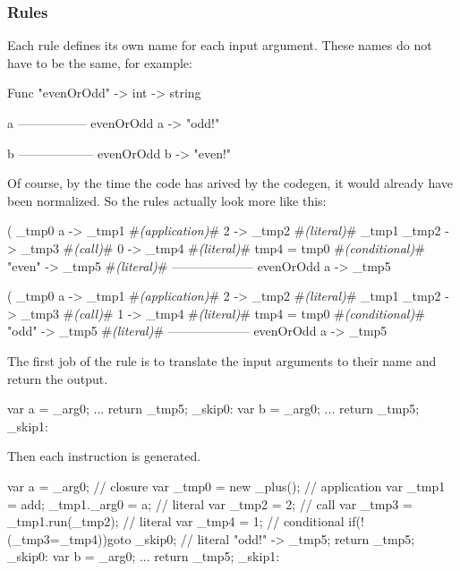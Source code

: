 \subsubsection{Rules}

Each rule defines its own name for each input argument.
These names do not have to be the same, for example:

\begin{code}
    Func "evenOrOdd" -> int -> string
    
    a%
    -----------------
    evenOrOdd a -> "odd!"

    b%
    ------------------
    evenOrOdd b -> "even!"
\end{code}

Of course, by the time the code has arived by the codegen, it would already have been normalized.
So the rules actually look more like this:

\begin{code}
    (%
    _tmp0 a -> _tmp1     #\textit{(application)}#
    2 -> _tmp2           #\textit{(literal)}#
    _tmp1 _tmp2 -> _tmp3 #\textit{(call)}#
    0 -> _tmp4           #\textit{(literal)}#
    tmp4 = tmp0          #\textit{(conditional)}#
    "even" -> _tmp5      #\textit{(literal)}#
    --------------------
    evenOrOdd a -> _tmp5
\end{code}

\begin{code}
    (%
    _tmp0 a -> _tmp1     #\textit{(application)}#
    2 -> _tmp2           #\textit{(literal)}#
    _tmp1 _tmp2 -> _tmp3 #\textit{(call)}#
    1 -> _tmp4           #\textit{(literal)}#
    tmp4 = tmp0          #\textit{(conditional)}#
    "odd" -> _tmp5       #\textit{(literal)}#
    --------------------
    evenOrOdd a -> _tmp5
\end{code}

The first job of the rule is to translate the input arguments to their name and return the output.

\begin{code}
    {
        var a = _arg0; 
        ...
        return _tmp5;
    }
    _skip0:
    {
        var b = _arg0;
        ...
        return _tmp5;
    }
    _skip1:
\end{code}

Then each instruction is generated.

\begin{code}
    {
        var a = _arg0; 
        // closure
        var _tmp0 = new _plus(); 
        // application
        var _tmp1 = add;
        _tmp1._arg0 = a;
        // literal
        var _tmp2 = 2;
        // call
        var _tmp3 = _tmp1.run(_tmp2);
        // literal     
        var _tmp4 = 1;
        // conditional
        if(!(_tmp3=_tmp4)){goto _skip0;}
        // literal
        "odd!" -> _tmp5;
        return _tmp5;
    }
    _skip0:
    {
        var b = _arg0;
        ...
        return _tmp5;
    }
    _skip1:
\end{code}


